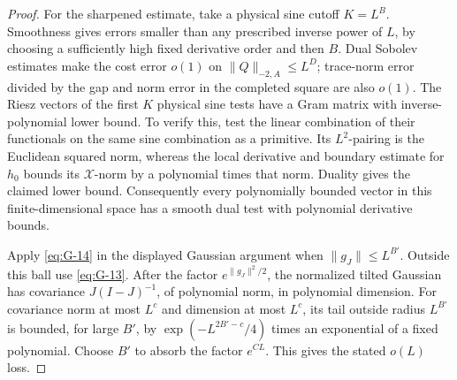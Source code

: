 \begin{proof}
For the sharpened estimate, take a physical sine cutoff \(K=L^B\).
Smoothness gives errors smaller than any prescribed inverse power of
\(L\), by choosing a sufficiently high fixed derivative order and then
\(B\). Dual Sobolev estimates make the cost error \(o(1)\) on
\(\|Q\|_{-2,A}\le L^D\); trace-norm error divided by the gap and
norm error in the completed square are also \(o(1)\).
The Riesz vectors of the first \(K\) physical sine tests have a Gram
matrix with inverse-polynomial lower bound. To verify this, test the
linear combination of their functionals on the same sine combination
as a primitive. Its \(L^2\)-pairing is the Euclidean squared norm,
whereas the local derivative and boundary estimate for \(h_0\) bounds
its \(\mathcal X\)-norm by a polynomial times that norm. Duality gives
the claimed lower bound. Consequently every polynomially bounded vector
in this finite-dimensional space has a smooth dual test with polynomial
derivative bounds.

Apply \eqref{eq:G-14} in the displayed Gaussian argument when
\(\|g_J\|\le L^{B'}\). Outside this ball use \eqref{eq:G-13}.
After the factor \(e^{\|g_J\|^2/2}\), the normalized tilted Gaussian
has covariance \(J(I-J)^{-1}\), of polynomial norm, in polynomial
dimension. For covariance norm at most \(L^c\) and dimension at most
\(L^c\), its tail outside radius \(L^{B'}\) is bounded, for large
\(B'\), by \(\exp(-L^{2B'-c}/4)\) times an exponential of a fixed
polynomial. Choose \(B'\) to absorb the factor \(e^{CL}\).
This gives the stated \(o(L)\) loss.
\end{proof}

